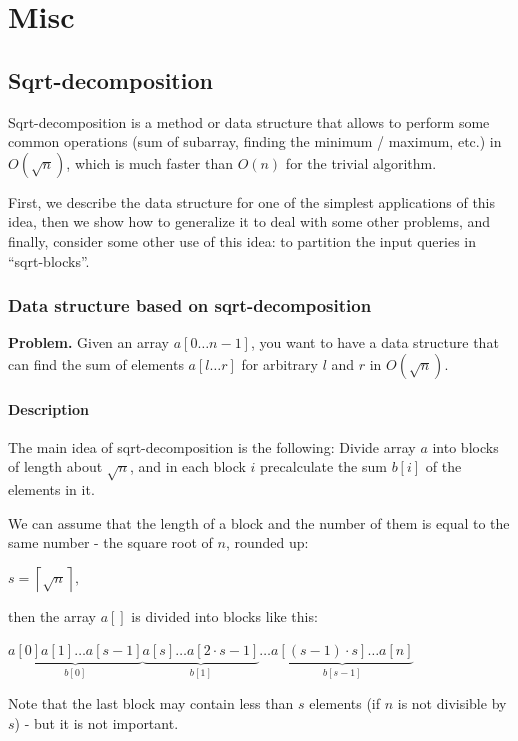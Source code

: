 \chapter{Misc}

\section{ Sqrt-decomposition } %
Sqrt-decomposition is a method or data structure that allows to perform some common operations (sum of subarray, finding the minimum / maximum, etc.) in $O (\sqrt {n})$, which is much faster than $O (n)$ for the trivial algorithm.

First, we describe the data structure for one of the simplest applications of this idea, then we show how to generalize it to deal with some other problems, and finally, consider some other use of this idea: to partition the input queries in ``sqrt-blocks''.

\subsection{ Data structure based on sqrt-decomposition }

\textbf{Problem.} Given an array $a [0 \ldots n-1]$, you want to have a data structure that can find the sum of elements $a [l \ldots r]$ for arbitrary $l$ and $r$ in $O (\sqrt {n})$.

\subsubsection{ Description }

The main idea of sqrt-decomposition is the following: Divide array $a$ into blocks of length about $\sqrt {n}$, and in each block $i$ precalculate the sum $b [i]$ of the elements in it.

We can assume that the length of a block and the number of them is equal to the same number - the square root of $n$, rounded up:

$s = \left \lceil \sqrt {n} \right \rceil,$

then the array $a []$ is divided into blocks like this:

$\underbrace{a[0]a[1]\ldots a[s-1]}_{b[0]}\underbrace{a[s]\ldots a[2\cdot s-1]}_{b[1]}\ldots\underbrace{a[(s-1)\cdot s]\ldots a[n]}_{b[s-1]}$

Note that the last block may contain less than $s$ elements (if $n$ is not divisible by $s$) - but it is not important.

